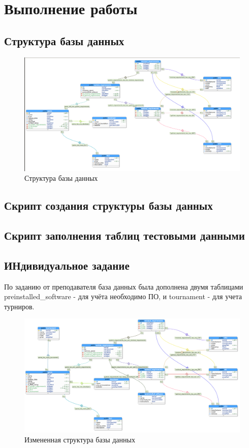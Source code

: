 \section{Выполнение работы}

\subsection{Структура базы данных}

\begin{figure}[H]
	\centering
	\includegraphics[width=\linewidth]{../../lab1/pics/scheme}
	\caption{Структура базы данных}
\end{figure}

\subsection{Скрипт создания структуры базы данных}



\subsection{Скрипт заполнения таблиц тестовыми данными}



\subsection{ИНдивидуальное задание}
По заданию от преподавателя база данных была дополнена двумя таблицами preinstalled_software - для учёта необходимо ПО, и tournament - для учета турниров.

\begin{figure}[H]
	\centering
	\includegraphics[width=\linewidth]{../newdatabase}
	\caption{Измененная структура базы данных}
\end{figure}

